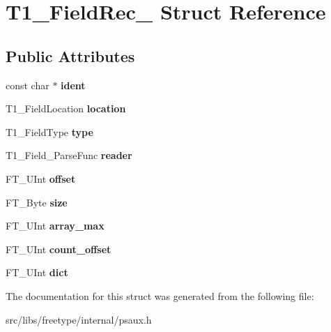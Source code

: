 \hypertarget{struct_t1___field_rec__}{
\section{T1\_\-FieldRec\_\- Struct Reference}
\label{struct_t1___field_rec__}
}
\subsection*{Public Attributes}
\begin{DoxyCompactItemize}
\item 
\hypertarget{struct_t1___field_rec___aaf70ae870eff9ea2b0518ef5e7301cfd}{
const char $\ast$ {\bfseries ident}}
\label{struct_t1___field_rec___aaf70ae870eff9ea2b0518ef5e7301cfd}

\item 
\hypertarget{struct_t1___field_rec___a1e17111c68df523f82d20bddd822ca4d}{
T1\_\-FieldLocation {\bfseries location}}
\label{struct_t1___field_rec___a1e17111c68df523f82d20bddd822ca4d}

\item 
\hypertarget{struct_t1___field_rec___ad873155b36b72db9a1feaf2699fed1ce}{
T1\_\-FieldType {\bfseries type}}
\label{struct_t1___field_rec___ad873155b36b72db9a1feaf2699fed1ce}

\item 
\hypertarget{struct_t1___field_rec___a95e227de47c22bdadd77f797ff43d89d}{
T1\_\-Field\_\-ParseFunc {\bfseries reader}}
\label{struct_t1___field_rec___a95e227de47c22bdadd77f797ff43d89d}

\item 
\hypertarget{struct_t1___field_rec___a41b503016f68291e061a2e29498982c1}{
FT\_\-UInt {\bfseries offset}}
\label{struct_t1___field_rec___a41b503016f68291e061a2e29498982c1}

\item 
\hypertarget{struct_t1___field_rec___a8ce74a7ad2276abe8942883e7fbb1241}{
FT\_\-Byte {\bfseries size}}
\label{struct_t1___field_rec___a8ce74a7ad2276abe8942883e7fbb1241}

\item 
\hypertarget{struct_t1___field_rec___a87f063bd3ad0dcfa30c00946d9f9cae8}{
FT\_\-UInt {\bfseries array\_\-max}}
\label{struct_t1___field_rec___a87f063bd3ad0dcfa30c00946d9f9cae8}

\item 
\hypertarget{struct_t1___field_rec___a41d8814cc651d0276f8cfad751721326}{
FT\_\-UInt {\bfseries count\_\-offset}}
\label{struct_t1___field_rec___a41d8814cc651d0276f8cfad751721326}

\item 
\hypertarget{struct_t1___field_rec___a509f7ddb1e0ffe050017daa29223e224}{
FT\_\-UInt {\bfseries dict}}
\label{struct_t1___field_rec___a509f7ddb1e0ffe050017daa29223e224}

\end{DoxyCompactItemize}


The documentation for this struct was generated from the following file:\begin{DoxyCompactItemize}
\item 
src/libs/freetype/internal/psaux.h\end{DoxyCompactItemize}
